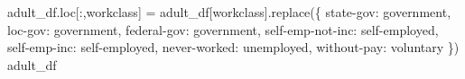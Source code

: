 \documentclass[
  letterpaper,
  DIV=11,
  numbers=noendperiod]{scrartcl}
\newenvironment{Shaded}{\begin{snugshade}}{\end{snugshade}}
\newcommand{\NormalTok}[1]{\textcolor[rgb]{0.00,0.23,0.31}{#1}}
\newcommand{\OperatorTok}[1]{\textcolor[rgb]{0.37,0.37,0.37}{#1}}
\newcommand{\StringTok}[1]{\textcolor[rgb]{0.13,0.47,0.30}{#1}}
\begin{document}
\begin{Shaded}
\begin{Highlighting}[]
\NormalTok{adult\_df.loc[:,}\StringTok{\textquotesingle{}workclass\textquotesingle{}}\NormalTok{] }\OperatorTok{=}\NormalTok{ adult\_df[}\StringTok{\textquotesingle{}workclass\textquotesingle{}}\NormalTok{].replace(\{}
    \StringTok{\textquotesingle{}state{-}gov\textquotesingle{}}\NormalTok{: }\StringTok{\textquotesingle{}government\textquotesingle{}}\NormalTok{,}
    \StringTok{\textquotesingle{}loc{-}gov\textquotesingle{}}\NormalTok{: }\StringTok{\textquotesingle{}government\textquotesingle{}}\NormalTok{, }
    \StringTok{\textquotesingle{}federal{-}gov\textquotesingle{}}\NormalTok{: }\StringTok{\textquotesingle{}government\textquotesingle{}}\NormalTok{, }
    \StringTok{\textquotesingle{}self{-}emp{-}not{-}inc\textquotesingle{}}\NormalTok{: }\StringTok{\textquotesingle{}self{-}employed\textquotesingle{}}\NormalTok{, }
    \StringTok{\textquotesingle{}self{-}emp{-}inc\textquotesingle{}}\NormalTok{: }\StringTok{\textquotesingle{}self{-}employed\textquotesingle{}}\NormalTok{, }
    \StringTok{\textquotesingle{}never{-}worked\textquotesingle{}}\NormalTok{: }\StringTok{\textquotesingle{}unemployed\textquotesingle{}}\NormalTok{,  }
    \StringTok{\textquotesingle{}without{-}pay\textquotesingle{}}\NormalTok{: }\StringTok{\textquotesingle{}voluntary\textquotesingle{}}
\NormalTok{\})}
\NormalTok{adult\_df}
\end{Highlighting}
\end{Shaded}
\end{document}
